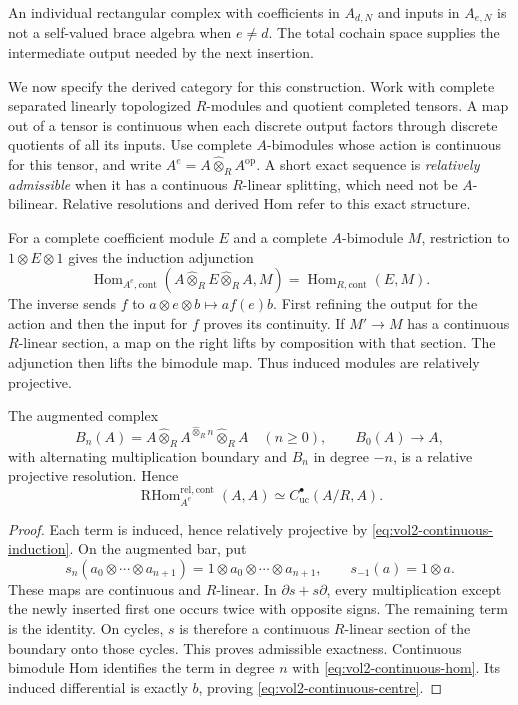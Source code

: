 An individual rectangular complex with coefficients in $A_{d,N}$
and inputs in $A_{e,N}$ is not a self-valued brace algebra when
$e\ne d$. The total cochain space supplies the intermediate output
needed by the next insertion.

We now specify the derived category for this construction. Work with
complete separated linearly topologized $R$-modules and quotient
completed tensors. A map out of a tensor is continuous when each
discrete output factors through discrete quotients of all its inputs.
Use complete $A$-bimodules whose action is continuous for this tensor,
and write $A^e=A\widehat\otimes_R A^{\mathrm{op}}$.
A short exact sequence is \emph{relatively admissible} when it has
a continuous $R$-linear splitting, which need not be $A$-bilinear.
Relative resolutions and derived Hom refer to this exact structure.

For a complete coefficient module $E$ and a complete $A$-bimodule $M$,
restriction to
$1\otimes E\otimes1$ gives the induction adjunction
\begin{equation}\label{eq:vol2-continuous-induction}
 \operatorname{Hom}_{A^e,\mathrm{cont}}
       (A\widehat\otimes_R E\widehat\otimes_R A,M)
   =\operatorname{Hom}_{R,\mathrm{cont}}(E,M).
\end{equation}
The inverse sends $f$ to $a\otimes e\otimes b\mapsto af(e)b$.
First refining the output for the action and then the input for $f$
proves its continuity. If $M'\to M$ has a continuous $R$-linear
section, a map on the right lifts by composition with that section.
The adjunction then lifts the bimodule map. Thus induced modules
are relatively projective.

\begin{theorem}\label{thm:vol2-continuous-bar}
The augmented complex
\[
 B_n(A)=A\widehat\otimes_R A^{\widehat\otimes_R n}
                   \widehat\otimes_R A\quad(n\geq0),
 \qquad B_0(A)\longrightarrow A,
\]
with alternating multiplication boundary and $B_n$ in degree $-n$,
is a relative projective resolution. Hence
\begin{equation}\label{eq:vol2-continuous-centre}
 \operatorname{RHom}^{\mathrm{rel,cont}}_{A^e}(A,A)
    \simeq C^\bullet_{\mathrm{uc}}(A/R,A).
\end{equation}
\end{theorem}

\begin{proof}
Each term is induced, hence relatively projective by
\eqref{eq:vol2-continuous-induction}. On the augmented bar, put
\[
 s_n(a_0\otimes\cdots\otimes a_{n+1})
   =1\otimes a_0\otimes\cdots\otimes a_{n+1},
 \qquad s_{-1}(a)=1\otimes a.
\]
These maps are continuous and $R$-linear. In $\partial s+s\partial$,
every multiplication except the newly inserted first one occurs
twice with opposite signs. The remaining term is the identity.
On cycles, $s$ is therefore a continuous $R$-linear section of the
boundary onto those cycles. This proves admissible exactness.
Continuous bimodule Hom identifies the term in degree $n$ with
\eqref{eq:vol2-continuous-hom}. Its induced differential is exactly
$b$, proving \eqref{eq:vol2-continuous-centre}.
\end{proof}

